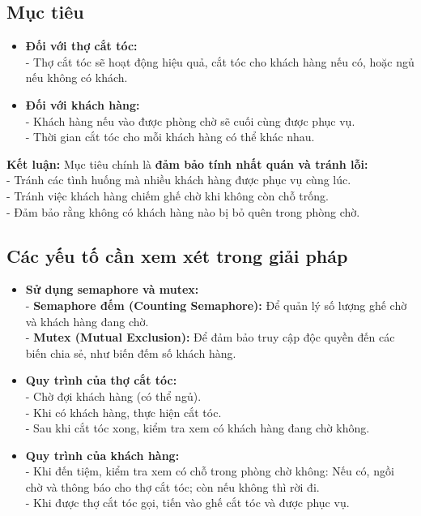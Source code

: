 \subsection{Mục tiêu}
\begin{itemize}
    \item \textbf{Đối với thợ cắt tóc:}\\
        - Thợ cắt tóc sẽ hoạt động hiệu quả, cắt tóc cho khách hàng nếu có, hoặc ngủ nếu không có khách.
    \item \textbf{Đối với khách hàng:}\\
        - Khách hàng nếu vào được phòng chờ sẽ cuối cùng được phục vụ.\\
        - Thời gian cắt tóc cho mỗi khách hàng có thể khác nhau.
\end{itemize}

    \textbf{Kết luận:} Mục tiêu chính là \textbf{đảm bảo tính nhất quán và tránh lỗi:}\\
        \hspace*{2em}
        - Tránh các tình huống mà nhiều khách hàng được phục vụ cùng lúc.\\
        \hspace*{2em}
        - Tránh việc khách hàng chiếm ghế chờ khi không còn chỗ trống.\\
        \hspace*{2em}
        - Đảm bảo rằng không có khách hàng nào bị bỏ quên trong phòng chờ.

\subsection{Các yếu tố cần xem xét trong giải pháp}
\begin{itemize}
    \item \textbf{Sử dụng semaphore và mutex:}\\
        - \textbf{Semaphore đếm (Counting Semaphore):} Để quản lý số lượng ghế chờ và khách hàng đang chờ.\\
        - \textbf{Mutex (Mutual Exclusion):} Để đảm bảo truy cập độc quyền đến các biến chia sẻ, như biến đếm số khách hàng.
    \item \textbf{Quy trình của thợ cắt tóc:}\\
        - Chờ đợi khách hàng (có thể ngủ).\\
        - Khi có khách hàng, thực hiện cắt tóc.\\
        - Sau khi cắt tóc xong, kiểm tra xem có khách hàng đang chờ không.
    \item \textbf{Quy trình của khách hàng:}\\
        - Khi đến tiệm, kiểm tra xem có chỗ trong phòng chờ không: Nếu có, ngồi chờ và thông báo cho thợ cắt tóc; còn nếu không thì rời đi.\\
        - Khi được thợ cắt tóc gọi, tiến vào ghế cắt tóc và được phục vụ.
\end{itemize}

